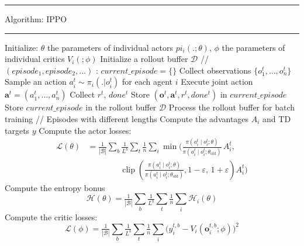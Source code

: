 \documentclass[varwidth, border=20pt]{standalone}
\begin{document}
\begingroup
\small                    
\begin{center}
  \begin{minipage}{0.99\linewidth} 
    \hrule height 0.7pt
    \vspace{3pt}
    Algorithm: IPPO
    \vspace{3pt}
    \hrule height 0.7pt
    \vspace{6pt}

   
    \begin{algorithmic}[1]
      \State Initialize: $\theta$ the parameters of individual actors $pi_i(.;\theta)$, $\phi$ the parameters of individual critics $V_i(;\phi)$
        \State Initialize a rollout buffer $\mathcal{D}$ // $(episode_1, episode_2, \dots)$
        :
            \State $current\_episode = \{ \}$ 
                \State Collect observations $\{o^t_1,\dots,o^t_n\}$ 
                \State  Sample an action $a_i^t \sim \pi_i(.|o_i^t)$ for each agent $i$
                \State Execute joint action $\mathbf{a}^t = (a_1^t,\dots,a_n^t)$
                \State Collect $r^t$, $done^t$
                \State Store $(\mathbf{o}^t,\mathbf{a}^t,r^t,done^t)$ in $current\_episode$
                \EndWhile
            \State Store $current\_episode$ in the rollout buffer $\mathcal{D}$
        \EndFor
        \State Process the rollout buffer for batch training // Episodes with different lengths
        \State Compute the advantages $A_i$ and TD targets $y$
        \State Compute the actor losses:
        \begin{align*}
            \mathcal{L}(\theta)
                &= \tfrac{1}{|\mathcal{B}|}\sum_b \tfrac{1}{L^b} \sum_t \tfrac{1}{n} \sum_i 
                    \min\!\Bigg(
                        \frac{\pi(a_i^t \mid o_i^t;\theta)}{\pi(a_i^t \mid o_i^t;\theta_{\text{old}})}\, A_i^t, \\
                &\qquad\qquad
                        \operatorname{clip}\!\left(
                            \frac{\pi(a_i^t \mid o_i^t;\theta)}{\pi(a_i^t \mid o_i^t;\theta_{\text{old}})},
                            1-\varepsilon,\,1+\varepsilon
                        \right) A_i^t
                    \Bigg)
            \end{align*}
        \State Compute the entropy bonus
        \Statex
        \[
            \mathcal{H}(\theta) =   \tfrac{1}{|\mathcal{B}|}\sum_b \tfrac{1}{L^b} \sum_t \tfrac{1}{n} \sum_i \mathcal{H}_i(\theta)
        \]
        \State Compute the critic losses: 
        \Statex
          \[
            \mathcal{L}(\phi)=\tfrac{1}{|\mathcal{B}|}\sum_b \tfrac{1}{L^b} \sum_t \tfrac{1}{n} \sum_i \Big(y^{t,b}_i -  V_i(\mathbf{o}^{t,b}_i; \phi)\Big)^2
          \]


\end{algorithmic}
\end{minipage}
\end{center}
\end{document}
